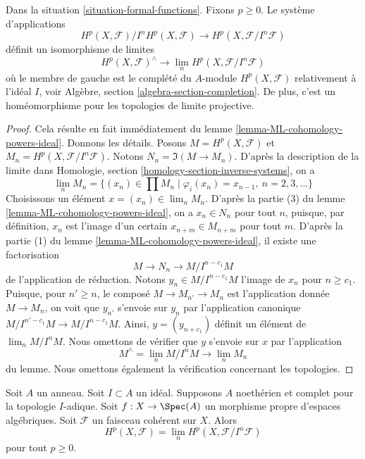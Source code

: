 \begin{theorem}
\label{theorem-formal-functions}
Dans la situation \ref{situation-formal-functions}. Fixons $p \geq 0$.
Le système d'applications
$$
H^p(X, \mathcal{F})/I^nH^p(X, \mathcal{F})
\longrightarrow
H^p(X, \mathcal{F}/I^n\mathcal{F})
$$
définit un isomorphisme de limites
$$
H^p(X, \mathcal{F})^\wedge
\longrightarrow
\lim_n H^p(X, \mathcal{F}/I^n\mathcal{F})
$$
où le membre de gauche est le complété du $A$-module
$H^p(X, \mathcal{F})$ relativement à l'idéal $I$, voir
Algèbre, section \ref{algebra-section-completion}.
De plus, c'est un homéomorphisme pour les topologies de limite projective.
\end{theorem}

\begin{proof}
Cela résulte en fait immédiatement du
lemme \ref{lemma-ML-cohomology-powers-ideal}. Donnons les détails.
Posons $M = H^p(X, \mathcal{F})$ et $M_n = H^p(X, \mathcal{F}/I^n\mathcal{F})$.
Notons $N_n = \Im(M \to M_n)$.
D'après la description de la limite dans Homologie, section
\ref{homology-section-inverse-systems}, on a
$$
\lim_n M_n
=
\{(x_n) \in \prod M_n \mid \varphi_i(x_n) = x_{n - 1}, \ n = 2, 3, \ldots\}
$$
Choisissons un élément $x = (x_n) \in \lim_n M_n$.
D'après la partie (3) du lemme \ref{lemma-ML-cohomology-powers-ideal},
on a $x_n \in N_n$ pour tout $n$, puisque, par
définition, $x_n$ est l'image d'un certain $x_{n + m} \in M_{n + m}$ pour
tout $m$. D'après la partie (1) du lemme \ref{lemma-ML-cohomology-powers-ideal},
il existe une factorisation
$$
M \to N_n \to M/I^{n - c_1}M
$$
de l'application de réduction. Notons $y_n \in M/I^{n - c_1}M$ l'image de $x_n$
pour $n \geq c_1$. Puisque, pour $n' \geq n$, le composé
$M \to M_{n'} \to M_n$ est l'application donnée $M \to M_n$, on voit que
$y_{n'}$ s'envoie sur $y_n$ par l'application canonique
$M/I^{n' - c_1}M \to M/I^{n - c_1}M$. Ainsi, $y = (y_{n + c_1})$
définit un élément de $\lim_n M/I^nM$.
Nous omettons de vérifier que $y$ s'envoie sur $x$ par
l'application
$$
M^\wedge = \lim_n M/I^nM \longrightarrow \lim_n M_n
$$
du lemme. Nous omettons également la vérification concernant les topologies.
\end{proof}

\begin{lemma}
\label{lemma-spell-out-theorem-formal-functions}
Soit $A$ un anneau. Soit $I \subset A$ un idéal. Supposons $A$
noethérien et complet pour la topologie $I$-adique.
Soit $f : X \to \Spec(A)$ un morphisme propre d'espaces algébriques.
Soit $\mathcal{F}$ un faisceau cohérent sur $X$. Alors
$$
H^p(X, \mathcal{F}) = \lim_n H^p(X, \mathcal{F}/I^n\mathcal{F})
$$
pour tout $p \geq 0$.
\end{lemma}

